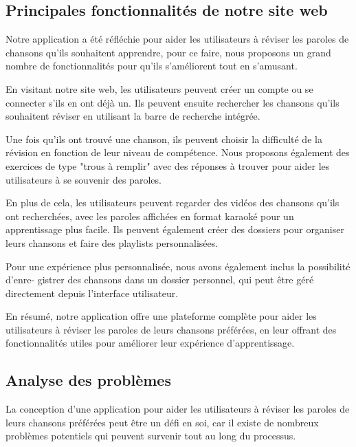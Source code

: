 \documentclass[12pt,french]{article}
\begin{document}
\subsection{Principales fonctionnalités de notre site web}

Notre application a été réfléchie pour aider les utilisateurs à réviser les paroles de chansons qu'ils souhaitent apprendre, pour ce faire, nous proposons un grand nombre de fonctionnalités pour qu'ils s'améliorent tout en s'amusant.
\newline 

En visitant notre site web, les utilisateurs peuvent créer un compte ou se connecter s'ils en ont déjà un. Ils peuvent ensuite rechercher les chansons qu'ils souhaitent réviser en utilisant la barre de recherche intégrée.
\newline 

Une fois qu'ils ont trouvé une chanson, ils peuvent choisir la difficulté de la révision en fonction de leur niveau de compétence. Nous proposons également des exercices de type "trous à remplir" avec des réponses à trouver pour aider les utilisateurs à se souvenir des paroles.
\newline 

En plus de cela, les utilisateurs peuvent regarder des vidéos des chansons qu'ils ont recherchées, avec les paroles affichées en format karaoké pour un apprentissage plus facile. Ils peuvent également créer des dossiers pour organiser leurs chansons et faire des playlists personnalisées.
\newline 

Pour une expérience plus personnalisée, nous avons également inclus la possibilité d'enre- gistrer des chansons dans un dossier personnel, qui peut être géré directement depuis l'interface utilisateur.
\newline 

En résumé, notre application offre une plateforme complète pour aider les utilisateurs à réviser les paroles de leurs chansons préférées, en leur offrant des fonctionnalités utiles pour améliorer leur expérience d'apprentissage.

\newpage

\vspace*{1cm}

\subsection{Analyse des problèmes}


La conception d'une application pour aider les utilisateurs à réviser les paroles de leurs chansons préférées peut être un défi en soi, car il existe de nombreux problèmes potentiels qui peuvent survenir tout au long du processus.
\newline
\end{document}
